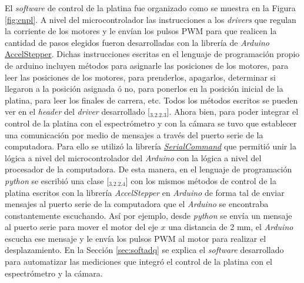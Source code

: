 El \textit{software} de control de la platina fue organizado como se muestra en la Figura \ref{fig:cnpl}. A nivel del microcontrolador las instrucciones a los \textit{drivers} que regulan la corriente de los motores y le envían los pulsos PWM para que realicen la cantidad de pasos elegidos fueron desarrolladas con la librería de \textit{Arduino} \href{https://www.airspayce.com/mikem/arduino/AccelStepper/}{AccelStepper}. Dichas instrucciones escritas en el lenguaje de programación propio de arduino incluyen métodos para asignarle las posiciones de los motores, para leer las posiciones de los motores, para prenderlos, apagarlos, determinar si llegaron a la posición asignada ó no, para ponerlos en la posición inicial de la platina, para leer los finales de carrera, etc. Todos los métodos escritos se pueden ver en el \textit{header} del \textit{driver} desarrollado [\href{https://github.com/jrr1984/open_frame_XYStage/tree/master/ino_main}{\faGithub$_{3.2.2.3}$}].
Ahora bien, para poder integrar el control de la platina con el espectrómetro y con la cámara se tuvo que establecer una comunicación por medio de mensajes a través del puerto serie de la computadora. Para ello se utilizó la librería \href{https://github.com/kroimon/Arduino-SerialCommand}{\textit{SerialCommand}} que permitió unir la lógica a nivel del microcontrolador del \textit{Arduino} con la lógica a nivel del procesador de la computadora. De esta manera, en el lenguaje de programación \textit{python} se escribió una clase [\href{https://github.com/jrr1984/open\_frame\_XYStage/blob/master/XYStage.py}{\faGithub$_{3.2.2.4}$}] con los mismos métodos de control de la platina escritos con la librería \textit{AccelStepper} en \textit{Arduino} de forma tal de enviar mensajes al puerto serie de la computadora que el \textit{Arduino} se encontraba constantemente escuchando. Así por ejemplo, desde \textit{python} se envía un mensaje al puerto serie para mover el motor del eje $\textit{x}$ una distancia de 2 mm, el \textit{Arduino} escucha ese mensaje y le envía los pulsos PWM al motor para realizar el desplazamiento. En la Sección \ref{sec:softadq} se explica el \textit{software} desarrollado para automatizar las mediciones que integró el control de la platina con el espectrómetro y la cámara.

